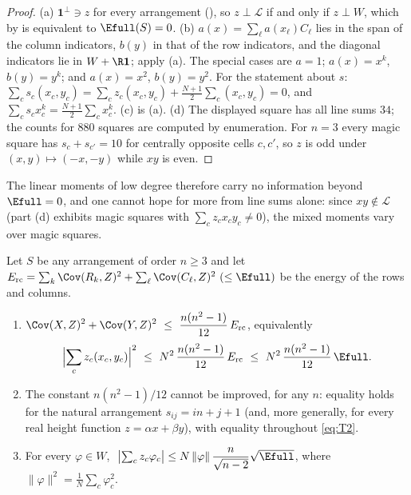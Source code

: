 \begin{proof}
(a) $\mathbf 1^{\perp}\ni z$ for every arrangement (), so $z\perp\mathcal L$ if and only if $z\perp W$, which by  is equivalent to $\Efull(S)=0$.
(b) $a(x)=\sum_\ell a(x_\ell)C_\ell$ lies in the span of the column indicators, $b(y)$ in that of the row indicators, and the diagonal indicators lie in $W+\R\mathbf 1$; apply (a).
The special cases are $a=1$; $a(x)=x^k$, $b(y)=y^k$; and $a(x)=x^2$, $b(y)=y^2$.
For the statement about $s$: $\sum_cs_c(x_c,y_c)=\sum_cz_c(x_c,y_c)+\frac{N+1}2\sum_c(x_c,y_c)=0$, and $\sum_cs_cx_c^k=\frac{N+1}2\sum_cx_c^k$.
(c) is (a).
(d) The displayed square has all line sums $34$; the counts for $880$ squares are computed by enumeration.
For $n=3$ every magic square has $s_c+s_{c'}=10$ for centrally opposite cells $c,c'$, so $z$ is odd under $(x,y)\mapsto(-x,-y)$ while $xy$ is even.
\end{proof}

The linear moments of low degree therefore carry no information beyond $\Efull=0$, and one cannot hope for more from line sums alone: since $xy\notin\mathcal L$ (part (d) exhibits magic squares with $\sum_cz_cx_cy_c\ne0$), the mixed moments vary over magic squares.

\begin{theorem}
\label{thm:quant_balance}
Let $S$ be any arrangement of order $n\ge3$ and let $E_{\mathrm{rc}}=\sum_k\Cov(R_k,Z)^2+\sum_\ell\Cov(C_\ell,Z)^2\ (\le\Efull)$ be the energy of the rows and columns.
\begin{enumerate}
\item[(a)] $\displaystyle \Cov(X,Z)^2+\Cov(Y,Z)^2\ \le\ \frac{n(n^2-1)}{12}\,E_{\mathrm{rc}}$, equivalently
\begin{equation}
\Bigl|\sum_cz_c(x_c,y_c)\Bigr|^2\ \le\ N^2\,\frac{n(n^2-1)}{12}\,E_{\mathrm{rc}}\ \le\ N^2\,\frac{n(n^2-1)}{12}\,\Efull .
\label{eq:T2}
\end{equation}
\item[(b)] The constant $n(n^2-1)/12$ cannot be improved, for any $n$: equality holds for the natural arrangement $s_{ij}=in+j+1$ (and, more generally, for every real height function $z=\alpha x+\beta y$), with equality throughout \eqref{eq:T2}.
\item[(c)] For every $\varphi\in W$, $\ \bigl|\sum_cz_c\varphi_c\bigr|\le N\,\|\varphi\|\,\dfrac{n}{\sqrt{n-2}}\sqrt{\Efull}$, where $\|\varphi\|^2=\frac1N\sum_c\varphi_c^2$.
\end{enumerate}
\end{theorem}

